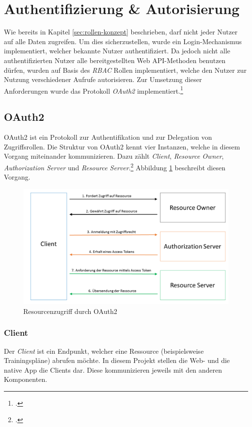 \section{Authentifizierung \& Autorisierung}
\label{sec:server-authorisierung}
Wie bereits in Kapitel \ref{sec:rollen-konzept} beschrieben, darf nicht jeder Nutzer auf alle Daten zugreifen. Um dies sicherzustellen, wurde ein Login-Mechanismus implementiert, welcher bekannte Nutzer authentifiziert. Da jedoch nicht alle authentifizierten Nutzer alle bereitgestellten Web \ac{API}-Methoden benutzen dürfen, wurden auf Basis des \textit{\ac{RBAC}} Rollen implementiert, welche den Nutzer zur Nutzung verschiedener Aufrufe autorisieren. Zur Umsetzung dieser Anforderungen wurde das Protokoll \textit{OAuth2} implementiert.\footcite{online:WebApi_Authorize}
\subsection{OAuth2}
\label{ssec:oauth2}
OAuth2 ist ein Protokoll zur Authentifikation und zur Delegation von Zugriffsrollen. Die Struktur von OAuth2 kennt vier Instanzen, welche in diesem Vorgang miteinander kommunizieren. Dazu zählt \textit{Client}, \textit{Resource Owner}, \textit{Authorization Server} und \textit{Resource Server}.\footcite[S. 286]{book:AngularJs:Steyer2015} Abbildung \ref{pic:OAuth2} beschreibt diesen Vorgang.
\begin{figure}[h]
\centering
\includegraphics[width=1\linewidth]{content/images/OAuth2}
\caption{Resourcenzugriff durch OAuth2}
\label{pic:OAuth2}
\end{figure}
\subsubsection*{Client}
Der \textit{Client} ist ein Endpunkt, welcher eine Ressource (beispielsweise Trainingspläne) abrufen möchte. In diesem Projekt stellen die Web- und die native App die Clients dar. Diese kommunizieren jeweils mit den anderen Komponenten.
